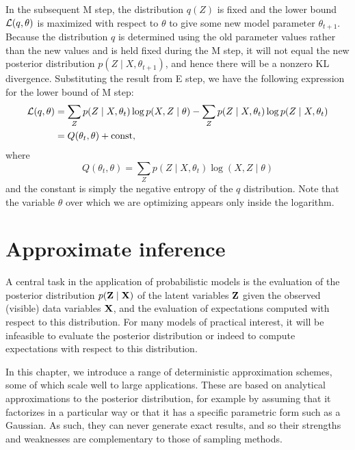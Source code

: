\documentclass[a4paper]{article}
\begin{document}
In the subsequent M step, the distribution $q(Z)$ is fixed
and the lower bound $\mathcal{L}(q, \theta)$ is maximized with 
respect to $\theta$ to give some new model parameter
$\theta_{t + 1}$. Because the distribution $q$ is determined 
using the old parameter values rather than the new values
and is held fixed during the M step, it will not equal the 
new posterior distribution $p(Z \mid X, \theta_{t+1})$,
and hence there will be a nonzero KL divergence.
Substituting the result from E step, we have the following 
expression for the lower bound of M step: 
\[
\begin{aligned}
  \mathcal{L}(q, \theta)
  &= \sum_Z p(Z \mid X, \theta_t) \log p(X, Z \mid \theta) 
  - \sum_Z p(Z \mid X, \theta_t) \log p(Z \mid X, \theta_t) \\
  &= Q(\theta_t, \theta) + \mathrm{const},
\end{aligned}
\]
where 
\[
Q(\theta_t, \theta) = \sum_Z p(Z \mid X, \theta_t) 
\log (X, Z \mid \theta)
\]
and the constant is simply the negative entropy of 
the $q$ distribution. Note that the variable $\theta$ 
over which we are optimizing appears only inside the 
logarithm.


\section{Approximate inference} 
A central task in the application of probabilistic models is 
the evaluation of the posterior distribution $p(\boldsymbol{\mathbf{Z}} \mid \boldsymbol{\mathbf{X}})$ of the 
latent variables $\boldsymbol{\mathbf{Z}}$ given the observed (visible) data variables 
$\boldsymbol{\mathbf{X}}$, and the evaluation of expectations computed with respect 
to this distribution. For many models of practical interest, 
it will be infeasible 
to evaluate the posterior distribution or indeed to compute 
expectations with respect to this distribution.

In this chapter, we introduce a range of deterministic 
approximation schemes, some of which scale well to large 
applications. These are based on analytical approximations 
to the posterior distribution, for example by assuming that 
it factorizes in a particular way or that it has a specific 
parametric form such as a Gaussian. As such, they can never 
generate exact results, and so their strengths and weaknesses 
are complementary to those of sampling methods.
\end{document}
